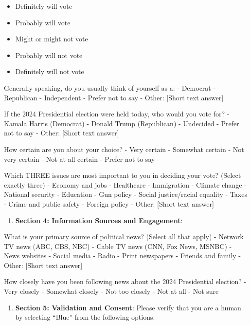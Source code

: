 \documentclass[
  letterpaper,
  DIV=11,
  numbers=noendperiod]{scrartcl}
\providecommand{\tightlist}{%
  \setlength{\itemsep}{0pt}\setlength{\parskip}{0pt}}\usepackage{longtable,booktabs,array}
\begin{document}
\begin{itemize}
\tightlist
\item
  Definitely will vote
\item
  Probably will vote
\item
  Might or might not vote
\item
  Probably will not vote
\item
  Definitely will not vote
\end{itemize}

Generally speaking, do you usually think of yourself as a: - Democrat -
Republican - Independent - Prefer not to say - Other: {[}Short text
answer{]}

If the 2024 Presidential election were held today, who would you vote
for? - Kamala Harris (Democrat) - Donald Trump (Republican) - Undecided
- Prefer not to say - Other: {[}Short text answer{]}

How certain are you about your choice? - Very certain - Somewhat certain
- Not very certain - Not at all certain - Prefer not to say

Which THREE issues are most important to you in deciding your vote?
(Select exactly three) - Economy and jobs - Healthcare - Immigration -
Climate change - National security - Education - Gun policy - Social
justice/racial equality - Taxes - Crime and public safety - Foreign
policy - Other: {[}Short text answer{]}

\begin{enumerate}
\def\labelenumi{\arabic{enumi}.}
\setcounter{enumi}{4}
\tightlist
\item
  \textbf{Section 4: Information Sources and Engagement}:
\end{enumerate}

What is your primary source of political news? (Select all that apply) -
Network TV news (ABC, CBS, NBC) - Cable TV news (CNN, Fox News, MSNBC) -
News websites - Social media - Radio - Print newspapers - Friends and
family - Other: {[}Short text answer{]}

How closely have you been following news about the 2024 Presidential
election? - Very closely - Somewhat closely - Not too closely - Not at
all - Not sure

\begin{enumerate}
\def\labelenumi{\arabic{enumi}.}
\setcounter{enumi}{5}
\tightlist
\item
  \textbf{Section 5: Validation and Consent}: Please verify that you are
  a human by selecting ``Blue'' from the following options:
\end{enumerate}
\end{document}
